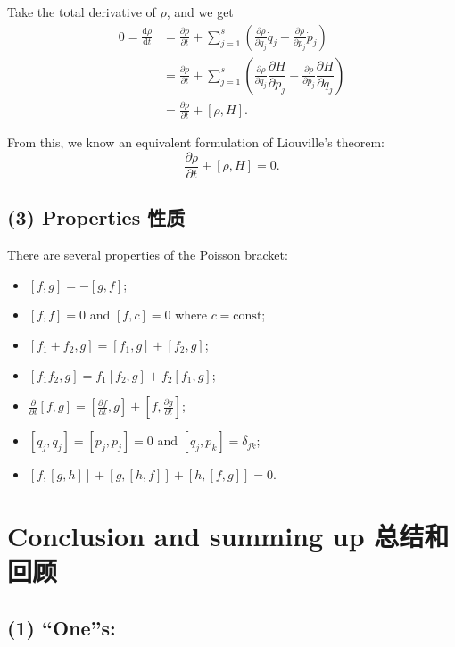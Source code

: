 Take the total derivative of \(\rho\), and we get \begin{align*}
    0 = \frac{\mathrm{d} \rho}{\mathrm{d}t} & = \frac{\partial \rho}{\partial t} + \sum_{j = 1}^{s} \left( \frac{\partial \rho}{\partial q_j} \dot{q}_j + \frac{\partial \rho}{\partial p_j} \dot{p}_j \right) \\
    & = \frac{\partial \rho}{\partial t} + \sum_{j = 1}^{s} \left( \frac{\partial \rho}{\partial q_j} \dfrac{\partial H}{\partial p_j} - \frac{\partial \rho}{\partial p_j} \dfrac{\partial H}{\partial q_j} \right) \\
    & = \frac{\partial \rho}{\partial t} + [\rho, H].
\end{align*}

From this, we know an equivalent formulation of Liouville's theorem:
\[\frac{\partial \rho}{\partial t} + [\rho, H] = 0.\]

\subsection*{(3) Properties 性质}\label{properties-ux6027ux8d28}

There are several properties of the Poisson bracket:

\begin{itemize}
\tightlist{}
\item
  \([f, g] = - [g, f]\);
\item
  \([f, f] = 0\) and \([f, c] = 0\) where \(c = \mathrm{const}\);
\item
  \([f_1 + f_2, g] = [f_1, g] + [f_2, g]\);
\item
  \([f_1 f_2, g] = f_1 [f_2, g] + f_2 [f_1, g]\);
\item
  \(\displaystyle \frac{\partial}{\partial t} [f, g] = [\frac{\partial f}{\partial t}, g] + [f, \frac{\partial g}{\partial t}]\);
\item
  \([q_j, q_j] = [p_j, p_j] = 0\) and \([q_j, p_k] = \delta_{jk}\);
\item
  \([f, [g, h]] + [g, [h, f]] + [h, [f, g]] = 0\).
\end{itemize}

\section{Conclusion and summing up 总结和回顾}\label{conclusion-ux7ed3ux8bba}

\subsection*{(1) ``One''s:}\label{ones}

